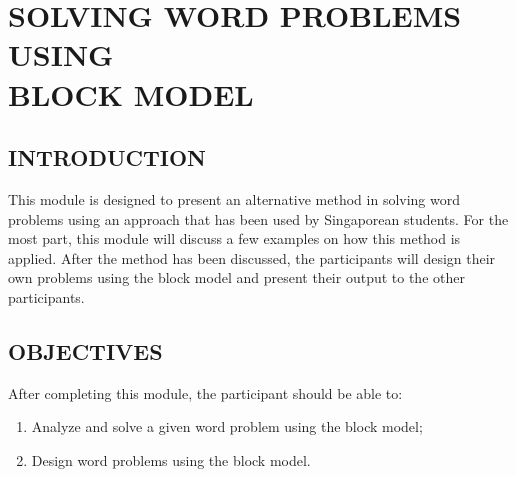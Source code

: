 \chapter[SOLVING WORD PROBLEMS USING\\ BLOCK MODEL]{SOLVING WORD PROBLEMS USING\\ BLOCK MODEL}
\section*{INTRODUCTION}
This module is designed to present an alternative method in solving word problems using an
approach that has been used by Singaporean students. For the most part, this module will discuss a
few examples on how this method is applied. After the method has been discussed, the participants
will design their own problems using the block model and present their output to the other
participants.
\section*{OBJECTIVES}
After completing this module, the participant should be able to:
\begin{enumerate}
\item Analyze and solve a given word problem using the block model;
\item Design word problems using the block model.
\end{enumerate}
